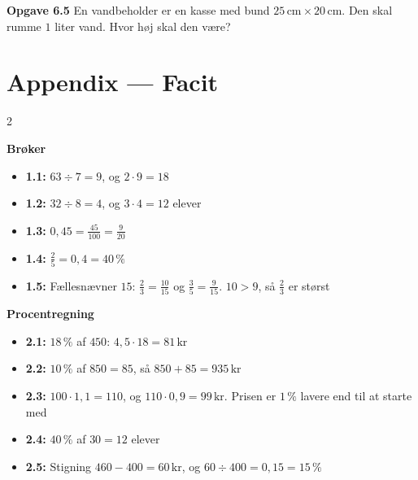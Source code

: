 \documentclass[11pt,a4paper]{article}
\begin{document}
\begin{opgavebox}
\textbf{Opgave 6.5} \quad En vandbeholder er en kasse med bund
$25\,\text{cm} \times 20\,\text{cm}$. Den skal rumme $1$ liter vand. Hvor høj
skal den være?
\end{opgavebox}

\newpage
\section*{Appendix --- Facit}

\begin{multicols}{2}
\small
\setlength{\parindent}{0pt}

\noindent\textbf{Brøker}
\begin{itemize}[leftmargin=1.3em, itemsep=1pt, topsep=2pt]
  \item \textbf{1.1:} $63 \div 7 = 9$, og $2 \cdot 9 = 18$
  \item \textbf{1.2:} $32 \div 8 = 4$, og $3 \cdot 4 = 12$ elever
  \item \textbf{1.3:} $0{,}45 = \tfrac{45}{100} = \tfrac{9}{20}$
  \item \textbf{1.4:} $\tfrac{2}{5} = 0{,}4 = 40\,\%$
  \item \textbf{1.5:} Fællesnævner $15$: $\tfrac{2}{3} = \tfrac{10}{15}$ og
        $\tfrac{3}{5} = \tfrac{9}{15}$. $10 > 9$, så $\tfrac{2}{3}$ er størst
\end{itemize}

\noindent\textbf{Procentregning}
\begin{itemize}[leftmargin=1.3em, itemsep=1pt, topsep=2pt]
  \item \textbf{2.1:} $18\,\%$ af $450$: $4{,}5 \cdot 18 = 81\,\text{kr}$
  \item \textbf{2.2:} $10\,\%$ af $850 = 85$, så $850 + 85 = 935\,\text{kr}$
  \item \textbf{2.3:} $100 \cdot 1{,}1 = 110$, og $110 \cdot 0{,}9 = 99\,\text{kr}$.
        Prisen er $1\,\%$ lavere end til at starte med
  \item \textbf{2.4:} $40\,\%$ af $30 = 12$ elever
  \item \textbf{2.5:} Stigning $460 - 400 = 60\,\text{kr}$, og
        $60 \div 400 = 0{,}15 = 15\,\%$
\end{itemize}


\end{multicols}
\end{document}

